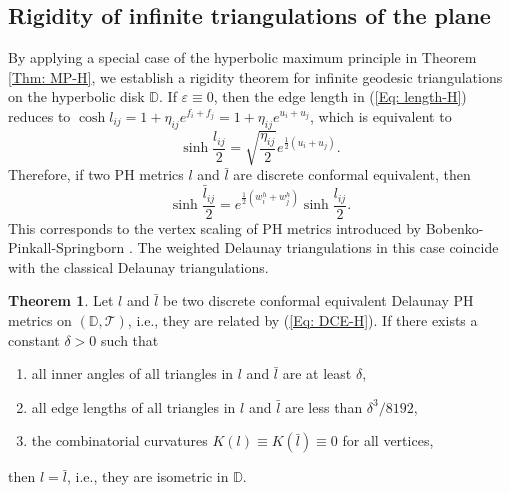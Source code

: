 \documentclass[12pt]{amsart}
\theoremstyle{definition}
\newtheorem{theorem}{Theorem}[section]
\begin{document}


\subsection{Rigidity of infinite triangulations of the plane} 

By applying a special case of the hyperbolic maximum principle in Theorem \ref{Thm: MP-H},
we establish a rigidity theorem for infinite geodesic triangulations on the hyperbolic disk $\mathbb{D}$.
If $\varepsilon \equiv 0$, then the edge length in (\ref{Eq: length-H}) reduces to $\cosh l_{ij}=1+\eta_{ij}e^{f_i+f_j} =1+\eta_{ij}e^{u_i+u_j}  $, which is equivalent to
\begin{equation*}
\sinh \frac{l_{ij}}{2}
=\sqrt{\frac{\eta_{ij}}{2}}e^{\frac{1}{2}(u_i+u_j)}.
\end{equation*}
Therefore, if two PH metrics $l$ and $\bar l$ are discrete conformal equivalent, then
\begin{equation}\label{Eq: DCE-H}
\sinh\frac{\bar l_{ij}}{2}
=e^{\frac{1}{2}(w^h_i+w^h_j)}\sinh \frac{l_{ij}}{2}.
\end{equation}
This corresponds to the vertex scaling of PH metrics introduced by Bobenko-Pinkall-Springborn \cite{BPS}.
The weighted Delaunay triangulations in this case coincide with the classical Delaunay triangulations.

\begin{theorem}\label{Thm: IR-H}
Let $l$ and $\bar{l}$ be two discrete conformal equivalent Delaunay PH metrics on $(\mathbb{D}, \mathcal{T})$, i.e., they are related by (\ref{Eq: DCE-H}).
If there exists a constant $\delta>0$ such that
\begin{enumerate}
\item[(a)] all inner angles of all triangles in $l$ and $\bar{l}$ are at least $\delta$,
\item[(b)] all edge lengths of all triangles in $l$ and $\bar{l}$ are less than $\delta^3/8192$,
\item[(c)] the combinatorial curvatures $K(l)\equiv K(\bar{l})\equiv0$ for all vertices,
\end{enumerate}
then $l=\bar{l}$, i.e., they are isometric in $\mathbb{D}$.
\end{theorem}
\end{document}
